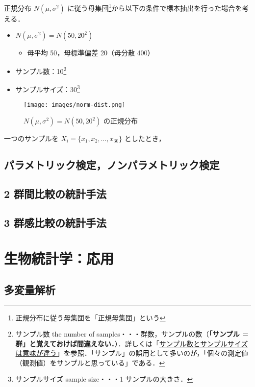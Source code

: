 正規分布 $N(\mu, \sigma^2)$ に従う母集団\footnote{正規分布に従う母集団を「正規母集団」という}から以下の条件で標本抽出を行った場合を考える．

\begin{itemize}
  \item $N(\mu, \sigma^2) = N(50, 20^2)$
        \begin{itemize}
          \item 母平均 50，母標準偏差 20（母分散 400）
        \end{itemize}
  \item サンプル数：10\footnote{サンプル数 the number of samples・・・群数，サンプルの数（\textbf{「サンプル = 群」と覚えておけば間違えない．}）．詳しくは「\href{https://biolab.sakura.ne.jp/sample-size.html}{\underline{サンプル数とサンプルサイズは意味が違う}}」を参照．「サンプル」の誤用として多いのが，「個々の測定値（観測値）をサンプルと思っている」である．}
  \item サンプルサイズ：30\footnote{サンプルサイズ sample size・・・1 サンプルの大きさ．}
\end{itemize}

\begin{figure}[H]
  \begin{center}
    \texttt{[image: images/norm-dist.png]}
    \caption{$N(\mu, \sigma^2) = N(50, 20^2)$ の正規分布}
  \end{center}
\end{figure}

一つのサンプルを $X_i = \{x_1, x_2, \ldots, x_{30}\}$ としたとき，

\section{パラメトリック検定，ノンパラメトリック検定}
\section{2 群間比較の統計手法}
\section{3 群感比較の統計手法}

\chapter{生物統計学：応用}
\section{多変量解析}
